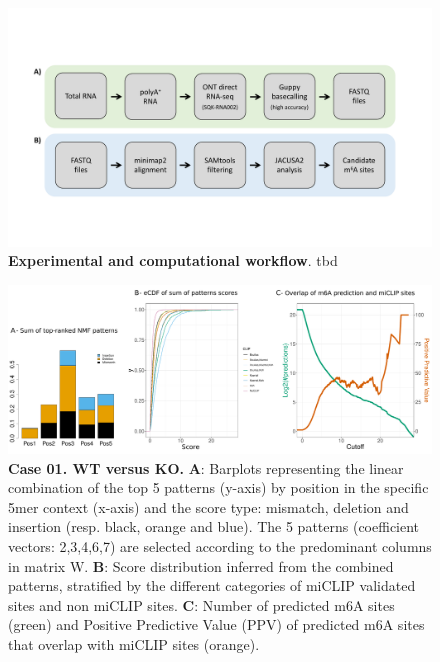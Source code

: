 \documentclass[times, 11pt, a4paper]{article}
\begin{document}
\begin{figure}[h!]
    \includegraphics[width = 1\textwidth]{Figure3.pdf}
  \caption{\textbf{Experimental and computational workflow}. tbd}
  \label{fig:workflow}
      \end{figure}
\newpage

\begin{figure}[h!]
	\includegraphics[width = 1\textwidth]{img/wt_ko.pdf}
	\caption{\textbf{Case 01. WT  versus KO.}  \textbf{A}: Barplots representing the linear combination of the top 5 patterns (y-axis) by position in the specific 5mer context (x-axis) and the score type: mismatch, deletion and insertion (resp. black, orange and blue). The 5 patterns (coefficient vectors: 2,3,4,6,7) are selected according to the predominant columns in matrix W.  \textbf{B}: Score distribution inferred from the combined patterns, stratified by the different categories of miCLIP validated sites and non miCLIP sites.  \textbf{C}: Number of predicted m6A sites (green) and Positive Predictive Value (PPV) of predicted m6A sites that overlap with miCLIP sites (orange). }
	\label{fig:WT_KO}
\end{figure}
\end{document}
